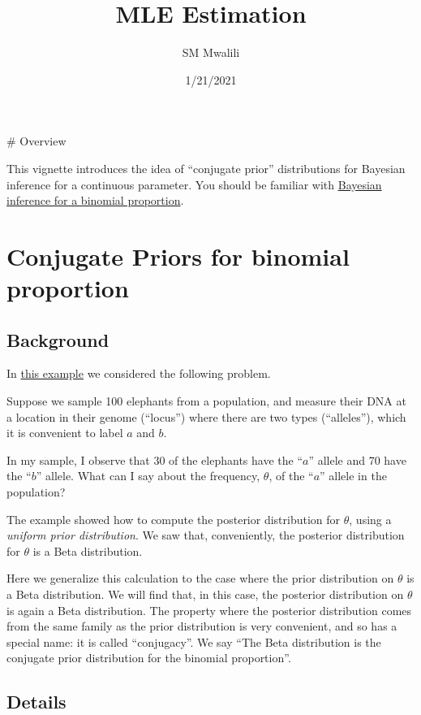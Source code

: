 \documentclass[
]{article}
\title{MLE Estimation}
\author{SM Mwalili}
\date{1/21/2021}
\begin{document}
\maketitle

\# Overview

This vignette introduces the idea of ``conjugate prior'' distributions
for Bayesian inference for a continuous parameter. You should be
familiar with \href{bayes_beta_binomial.html}{Bayesian inference for a
binomial proportion}.

\hypertarget{conjugate-priors-for-binomial-proportion}{%
\section{Conjugate Priors for binomial
proportion}\label{conjugate-priors-for-binomial-proportion}}

\hypertarget{background}{%
\subsection{Background}\label{background}}

In \href{bayes_beta_binomial.html}{this example} we considered the
following problem.

Suppose we sample 100 elephants from a population, and measure their DNA
at a location in their genome (``locus'') where there are two types
(``alleles''), which it is convenient to label \(a\) and \(b\).

In my sample, I observe that 30 of the elephants have the ``\(a\)''
allele and 70 have the ``\(b\)'' allele. What can I say about the
frequency, \(\theta\), of the ``\(a\)'' allele in the population?

The example showed how to compute the posterior distribution for
\(\theta\), using a \emph{uniform prior distribution}. We saw that,
conveniently, the posterior distribution for \(\theta\) is a Beta
distribution.

Here we generalize this calculation to the case where the prior
distribution on \(\theta\) is a Beta distribution. We will find that, in
this case, the posterior distribution on \(\theta\) is again a Beta
distribution. The property where the posterior distribution comes from
the same family as the prior distribution is very convenient, and so has
a special name: it is called ``conjugacy''. We say ``The Beta
distribution is the conjugate prior distribution for the binomial
proportion''.

\hypertarget{details}{%
\subsection{Details}\label{details}}
\end{document}
